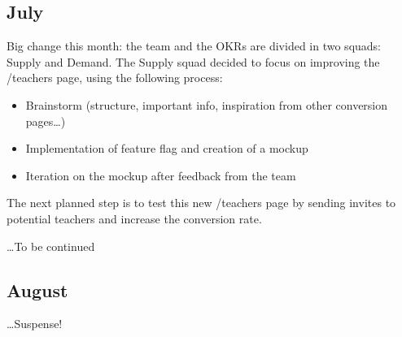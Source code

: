 \subsection{July}
\label{ssec:july}

Big change this month: the team and the OKRs are divided in two squads: Supply and Demand.
The Supply squad decided to focus on improving the /teachers page, using the following process:
\begin{itemize}
\item Brainstorm (structure, important info, inspiration from other conversion pages\ldots)
\item Implementation of feature flag and creation of a mockup
\item Iteration on the mockup after feedback from the team
\end{itemize}

The next planned step is to test this new /teachers page by sending invites to potential teachers and increase the conversion rate.

\ldots To be continued

\subsection{August}
\label{ssec:august}

\ldots Suspense!
